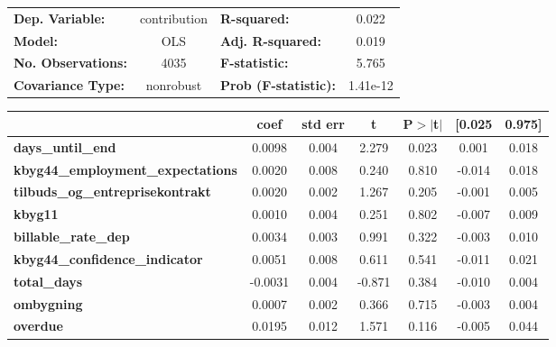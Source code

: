 \begin{center}
\begin{tabular}{lclc}
\toprule
\textbf{Dep. Variable:}                   &  contribution & \textbf{  R-squared:         } &     0.022   \\
\textbf{Model:}                           &      OLS      & \textbf{  Adj. R-squared:    } &     0.019   \\
\textbf{No. Observations:}                &       4035    & \textbf{  F-statistic:       } &     5.765   \\
\textbf{Covariance Type:}                 &   nonrobust   & \textbf{  Prob (F-statistic):} &  1.41e-12   \\
\bottomrule
\end{tabular}
\begin{tabular}{lcccccc}
                                          & \textbf{coef} & \textbf{std err} & \textbf{t} & \textbf{P$> |$t$|$} & \textbf{[0.025} & \textbf{0.975]}  \\
\midrule
\textbf{days\_until\_end}                 &       0.0098  &        0.004     &     2.279  &         0.023        &        0.001    &        0.018     \\
\textbf{kbyg44\_employment\_expectations} &       0.0020  &        0.008     &     0.240  &         0.810        &       -0.014    &        0.018     \\
\textbf{tilbuds\_og\_entreprisekontrakt}  &       0.0020  &        0.002     &     1.267  &         0.205        &       -0.001    &        0.005     \\
\textbf{kbyg11}                           &       0.0010  &        0.004     &     0.251  &         0.802        &       -0.007    &        0.009     \\
\textbf{billable\_rate\_dep}              &       0.0034  &        0.003     &     0.991  &         0.322        &       -0.003    &        0.010     \\
\textbf{kbyg44\_confidence\_indicator}    &       0.0051  &        0.008     &     0.611  &         0.541        &       -0.011    &        0.021     \\
\textbf{total\_days}                      &      -0.0031  &        0.004     &    -0.871  &         0.384        &       -0.010    &        0.004     \\
\textbf{ombygning}                        &       0.0007  &        0.002     &     0.366  &         0.715        &       -0.003    &        0.004     \\
\textbf{overdue}                          &       0.0195  &        0.012     &     1.571  &         0.116        &       -0.005    &        0.044     \\

\end{tabular}
\end{center}
